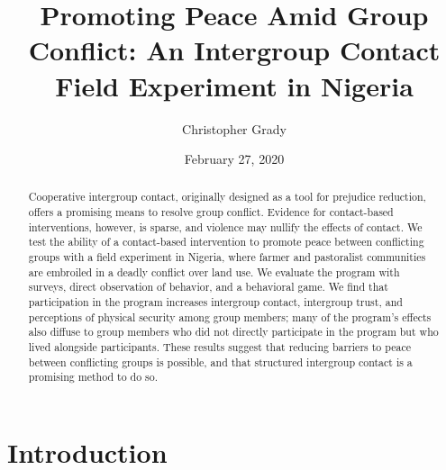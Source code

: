 \documentclass[11pt]{article}
\title{Promoting Peace Amid Group Conflict: An Intergroup Contact Field
Experiment in Nigeria}
\author{
Christopher Grady
}
\date{February 27, 2020}
\begin{document}
\VerbatimFootnotes

%
%
%
%
%
%
%
%
%
%

\maketitle

\begin{abstract}

Cooperative intergroup contact, originally designed as a tool for prejudice reduction, offers a promising means to resolve group conflict.  Evidence for contact-based interventions, however, is sparse, and violence may nullify the effects of contact.  We test the ability of a contact-based intervention to promote peace between conflicting groups with a field experiment in Nigeria, where farmer and pastoralist communities are embroiled in a deadly conflict over land use.  We evaluate the program with surveys, direct observation of behavior, and a behavioral game.  We find that participation in the program increases intergroup contact, intergroup trust, and perceptions of physical security among group members; many of the program's effects also diffuse to group members who did not directly participate in the program but who lived alongside participants.  These results suggest that reducing barriers to peace between conflicting groups is possible, and that structured intergroup contact is a promising method to do so.

\end{abstract}

\hypertarget{introduction}{%
\section{Introduction}\label{introduction}}
\end{document}
